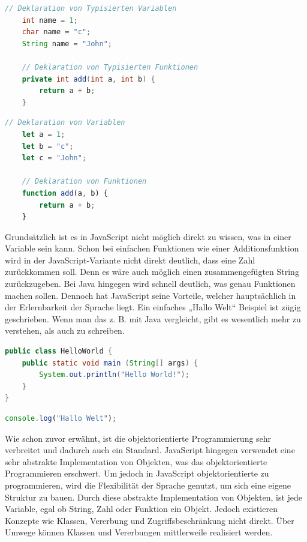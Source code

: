 \begin{lstlisting}[caption=Java Variablen und Funktion deklarations Beispiel, label=variables-and-functions-example-java, language=Java]
    // Deklaration von Typisierten Variablen
    int name = 1;
    char name = "c";
    String name = "John";

    // Deklaration von Typisierten Funktionen
    private int add(int a, int b) {
        return a + b;
    }
\end{lstlisting}

\begin{lstlisting}[caption=JavaScript Variablen und Funktion deklarations Beispiel, label=variables-and-functions-example-javascript, language=JavaScript]
    // Deklaration von Variablen
    let a = 1;
    let b = "c";
    let c = "John";

    // Deklaration von Funktionen
    function add(a, b) {
        return a + b;
    }
\end{lstlisting}

Grundsätzlich ist es in JavaScript nicht möglich direkt zu wissen, was in einer Variable sein kann. Schon bei einfachen Funktionen wie einer Additionsfunktion wird in der JavaScript-Variante nicht direkt deutlich, dass eine Zahl zurückkommen soll. Denn es wäre auch möglich einen zusammengefügten String zurückzugeben. Bei Java hingegen wird schnell deutlich, was genau Funktionen machen sollen. Dennoch hat JavaScript seine Vorteile, welcher hauptsächlich in der Erlernbarkeit der Sprache liegt. Ein einfaches „Hallo Welt“ Beispiel ist zügig geschrieben. Wenn man das z. B. mit Java vergleicht, gibt es wesentlich mehr zu verstehen, als auch zu schreiben.

\begin{lstlisting}[caption=„Hallo Welt“ Beispiel in Java, label=hello-world-example-in-java, language=Java]
public class HelloWorld {
	public static void main (String[] args) {
		System.out.println("Hello World!");
	}
}
\end{lstlisting}

\begin{lstlisting}[caption=„Hallo Welt“ Beispiel in JavaScript, label=hello-world-example-in-javascript, language=JavaScript]
    console.log("Hallo Welt");
\end{lstlisting}

Wie schon zuvor erwähnt, ist die objektorientierte Programmierung sehr verbreitet und dadurch auch ein Standard. JavaScript hingegen verwendet eine sehr abstrakte Implementation von Objekten, was das objektorientierte Programmieren erschwert. Um jedoch in JavaScript objektorientierte zu programmieren, wird die Flexibilität der Sprache genutzt, um sich eine eigene Struktur zu bauen. Durch diese abstrakte Implementation von Objekten, ist jede Variable, egal ob String, Zahl oder Funktion ein Objekt. Jedoch existieren Konzepte wie Klassen, Vererbung und Zugriffsbeschränkung nicht direkt. Über Umwege können Klassen und Vererbungen mittlerweile realisiert werden.

